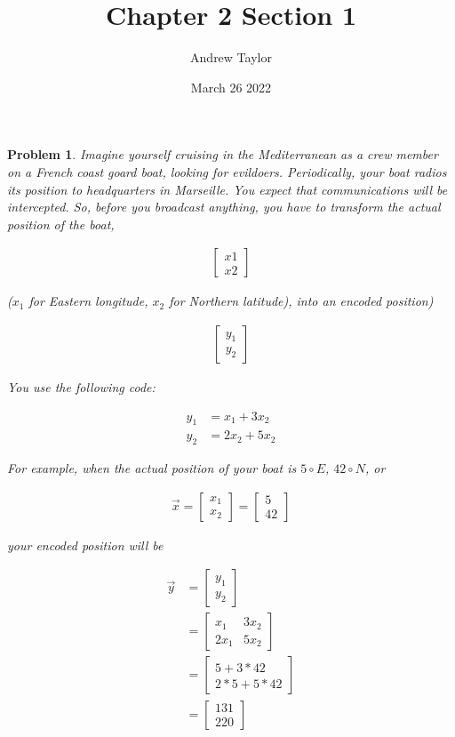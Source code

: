 \documentclass{article}
\title{Chapter 2 Section 1}
\author{Andrew Taylor}
\date{March 26 2022}
\newtheorem{problem}{Problem}
\begin{document}
\begin{problem}
Imagine yourself cruising in the Mediterranean as a crew member on a French coast goard boat, looking for evildoers. Periodically, your boat radios its position to headquarters in Marseille. You expect that communications will be intercepted. So, before you broadcast anything, you have to transform the actual position of the boat,

\begin{align*}
\begin{bmatrix}
x1 \\ x2
\end{bmatrix}
\end{align*}

($x_{1}$ for Eastern longitude, $x_{2}$ for Northern latitude), into an encoded position)

\begin{align*}
\begin{bmatrix}
y_{1} \\ y_{2}
\end{bmatrix}
\end{align*}

You use the following code:

\begin{align*}
y_{1} &= x_{1} + 3x_{2} \\
y_{2} &= 2x_{2} + 5x_{2}
\end{align*}

For example, when the actual position of your boat is $5 \circ E$, $42 \circ N$, or

\begin{align*}
\vec{x} = \begin{bmatrix} x_{1} \\ x_{2} \end{bmatrix} = \begin{bmatrix} 5 \\ 42 \end{bmatrix}
\end{align*}

your encoded position will be 

\begin{align*}
\vec{y} 
&= \begin{bmatrix} y_{1} \\ y_{2} \end{bmatrix} \\
&= \begin{bmatrix} 
x_{1} & 3x_{2} \\ 
2x_{1} & 5x_{2} 
\end{bmatrix} \\
&= \begin{bmatrix}
5 + 3 * 42 \\ 2 * 5 + 5 * 42
\end{bmatrix} \\
&= \begin{bmatrix} 
131 \\ 220
\end{bmatrix}
\end{align*}

\end{problem}
\end{document}
